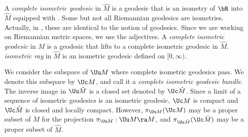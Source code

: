  A {\em complete isometric geodesic} in $\hat{M}$ is a geodesic that is an isometry of 
  $\bR$ into $\hat{M}$ equipped with . 
 Some but not all Riemannian geodesics are isometries. 
Actually, in , these are identical to the notion of geodesics.
Since we are working on Riemannian metric spaces, we use the adjectives.  
  A {\em complete isometric geodesic} in $M$ is a geodesic that lifts to 
  a complete isometric geodesic in $\hat{M}$. 
 {\em isometric ray} in $\hat M$ is an isometric geodesic defined on  %
$[0, \infty)$. 

  
%
  

We consider the subspace of $\Uu M$ where complete isometric geodesics pass. We denote this subspace by $\Uc M$, and call it a \emph{complete isometric geodesic  bundle}. The inverse image in $\Uu \hat{M}$ is a closed set denoted by $\Uc \hat{M}$. Since a limit of a sequence of isometric geodesics is an isometric geodesic, $\Uc M$ is compact and $\Uc \hat{M}$ is closed and locally compact. However, $\pi_{\Uu M}(\Uc M)$ may be a proper subset of $M$ for the
projection $\pi_{\Uu M}: \Uu M \ra M$, and
$\pi_{\Uu \hat{M}}(\Uc \hat{M})$ may be a proper subset of $\hat{M}$.



